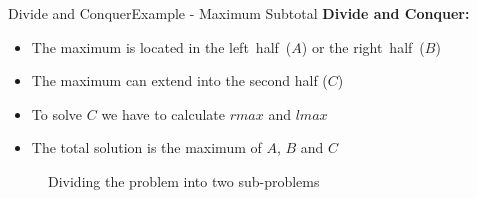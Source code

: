 
\begin{frame}{Divide and Conquer}{Example - Maximum Subtotal}
  \textbf{Divide and Conquer:}
  \begin{itemize}
    \item
      The maximum is located in the {\color{Mittel-Blau}left~half~($A$)}
      or the {\color{Mittel-Blau}right~half~($B$)}
    \item
      The maximum can {\color{Mittel-Blau}extend into the second half ($C$)}
    \item
      To solve $C$ we have to calculate $rmax$ and $lmax$
    \item
      The total solution is the {\color{Mittel-Blau}maximum of $A$, $B$ and $C$}
  \end{itemize}
  \begin{figure}
    \begin{adjustbox}{width=\linewidth}
      
    \end{adjustbox}
    \caption{Dividing the problem into two sub-problems}
    \label{fig:divide_and_conquer:max_sub_total_divide2}
  \end{figure}
\end{frame}




